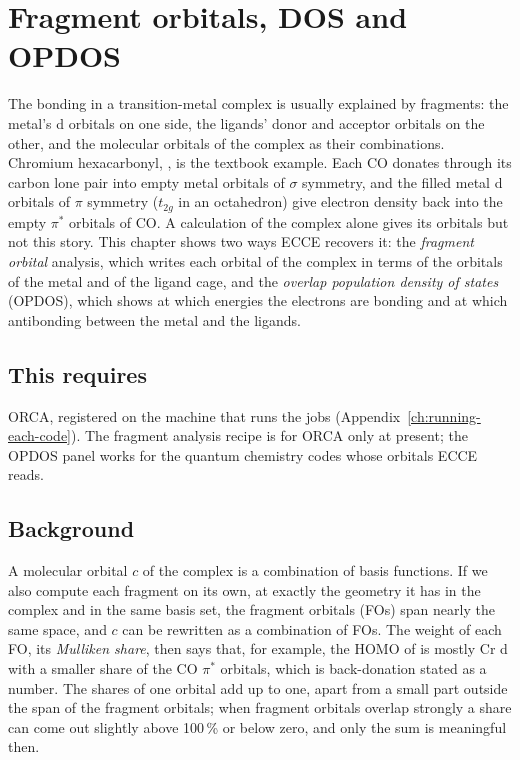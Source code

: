 \chapter{Fragment orbitals, DOS and OPDOS}
\label{ch:fragment-orbitals}

The bonding in a transition-metal complex is usually explained by fragments: the metal's d orbitals on one side, the ligands' donor and acceptor orbitals on the other, and the molecular orbitals of the complex as their combinations. Chromium hexacarbonyl, , is the textbook example. Each CO donates through its carbon lone pair into empty metal orbitals of $\sigma$ symmetry, and the filled metal d orbitals of $\pi$ symmetry ($t_{2g}$ in an octahedron) give electron density back into the empty $\pi^*$ orbitals of CO. A calculation of the complex alone gives its orbitals but not this story. This chapter shows two ways ECCE recovers it: the \emph{fragment orbital} analysis, which writes each orbital of the complex in terms of the orbitals of the metal and of the ligand cage, and the \emph{overlap population density of states} (OPDOS), which shows at which energies the electrons are bonding and at which antibonding between the metal and the ligands.

\section*{This requires}
ORCA, registered on the machine that runs the jobs (Appendix~\ref{ch:running-each-code}). The fragment analysis recipe is for ORCA only at present; the OPDOS panel works for the quantum chemistry codes whose orbitals ECCE reads.

\section{Background}
A molecular orbital $c$ of the complex is a combination of basis functions. If we also compute each fragment on its own, at exactly the geometry it has in the complex and in the same basis set, the fragment orbitals (FOs) span nearly the same space, and $c$ can be rewritten as a combination of FOs. The weight of each FO, its \emph{Mulliken share}, then says that, for example, the HOMO of  is mostly Cr d with a smaller share of the CO $\pi^*$ orbitals, which is back-donation stated as a number. The shares of one orbital add up to one, apart from a small part outside the span of the fragment orbitals; when fragment orbitals overlap strongly a share can come out slightly above 100\,\% or below zero, and only the sum is meaningful then.

